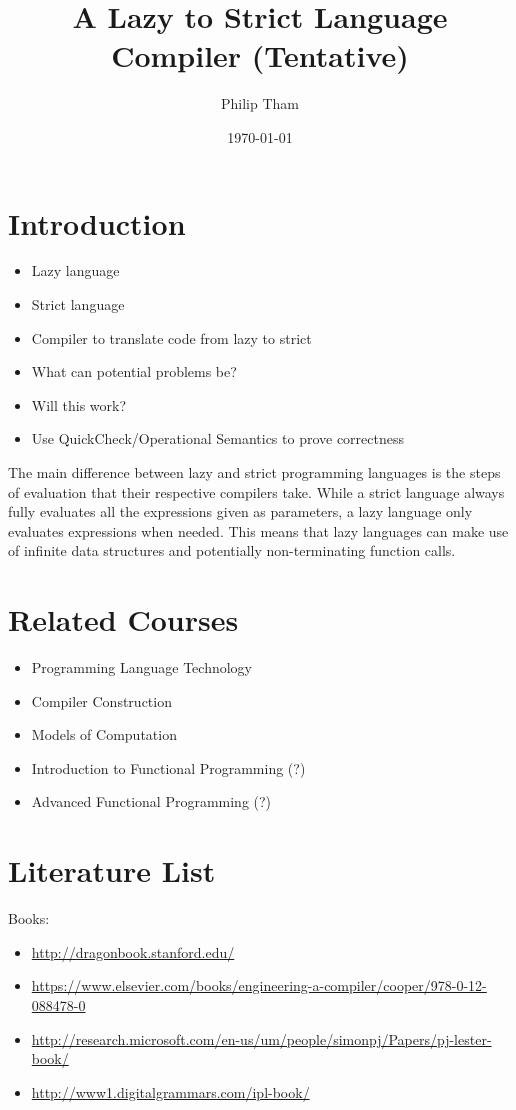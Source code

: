 \documentclass[11pt]{article}
\author{Philip Tham}
\date{\today}
\title{A Lazy to Strict Language Compiler (Tentative)}
\begin{document}
\maketitle
\newpage

\section{Introduction}
\label{sec-1}
\begin{itemize}
\item Lazy language
\item Strict language
\item Compiler to translate code from lazy to strict
\item What can potential problems be?
\item Will this work?
\item Use QuickCheck/Operational Semantics to prove correctness
\end{itemize}


The main difference between lazy and strict programming languages is the steps
of evaluation that their respective compilers take. While a strict language
always fully evaluates all the expressions given as parameters, a lazy language
only evaluates expressions when needed. This means that lazy languages can make
use of infinite data structures and potentially non-terminating function calls.


\section{Related Courses}
\label{sec-2}
\begin{itemize}
\item Programming Language Technology
\item Compiler Construction
\item Models of Computation
\item Introduction to Functional Programming (?)
\item Advanced Functional Programming (?)
\end{itemize}


\section{Literature List}
\label{sec-3}
Books:
\begin{itemize}
\item \url{http://dragonbook.stanford.edu/}
\item \url{https://www.elsevier.com/books/engineering-a-compiler/cooper/978-0-12-088478-0}
\item \url{http://research.microsoft.com/en-us/um/people/simonpj/Papers/pj-lester-book/}
\item \url{http://www1.digitalgrammars.com/ipl-book/}
\end{itemize}
\end{document}
